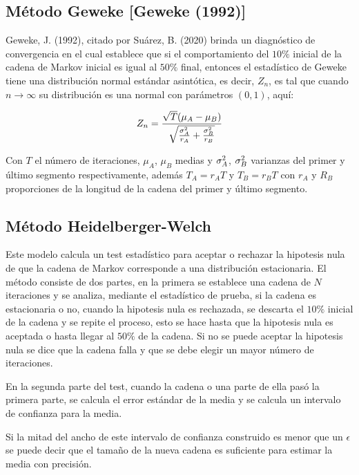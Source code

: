  

\subsection{Método Geweke [Geweke (1992)]}

Geweke, J. (1992), \cite{geweke} citado por Suárez, B. (2020) \cite{tesisbiviana}  brinda un diagnóstico de convergencia en el cual establece que si el comportamiento del $10\%$ inicial de la cadena de Markov inicial es igual al $50\%$ final, entonces el estadístico de Geweke tiene una distribución normal estándar asintótica, es decir, $Z_n$, es tal que cuando $n\rightarrow \infty$ su distribución es una normal con parámetros $(0,1)$, aquí:


\begin{equation}
\label{estadistico}
Z_n=\frac{\sqrt{T}(\mu_A-\mu_B)}{\sqrt{\frac{\sigma_A^2}{r_A}+\frac{\sigma_B^2}{r_B}}}
\end{equation}

Con $T$ el número de iteraciones, $\mu_A$, $\mu_B$ medias y $\sigma_A^2$, $\sigma_B^2$ varianzas del primer y último segmento respectivamente, además $T_A=r_AT$ y  $T_B=r_BT$ con $r_A$ y $R_B$ proporciones de la longitud de la cadena del primer y último segmento. 


\subsection{Método Heidelberger-Welch}

Este modelo calcula un test estadístico para aceptar o rechazar la hipotesis nula de que la cadena de Markov corresponde a una distribución estacionaria. El método consiste de dos partes, en la primera se establece una cadena de $N$ iteraciones y se analiza, mediante el estadístico de prueba, si la cadena es estacionaria o no, cuando la hipotesis nula es rechazada, se descarta el $10\%$ inicial de la cadena y se repite el proceso, esto se hace hasta que la hipotesis nula es aceptada o hasta llegar al $50\%$ de la cadena. Si no se puede aceptar la hipotesis nula se dice que la cadena falla y que se debe elegir un mayor número de iteraciones. 

En la segunda parte del test, cuando la cadena o una parte de ella pasó la primera parte, se calcula el error estándar de la media y se calcula un intervalo de confianza para la media. 

Si la mitad del ancho de este intervalo de confianza construido es menor que un $\epsilon$ se puede decir que el tamaño de la nueva cadena es suficiente para estimar la media con precisión. \cite{romo}

